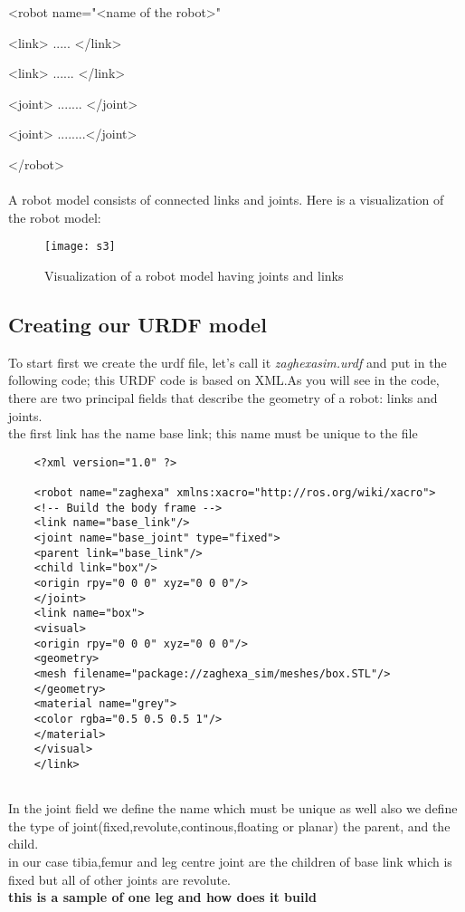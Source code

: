 	<robot name="<name of the robot>"
	
	<link>  ..... </link>
	
	<link> ...... </link>
	
	<joint> ....... </joint>
	
	<joint> ........</joint>
	
	</robot>
	\\\\A robot model consists of connected links and joints. Here is a visualization of the robot model:
	\begin{figure}[h]
		\centering
		\texttt{[image: s3]}
		\caption{Visualization of a robot model having joints and links}
		\label{fig:s3}
	\end{figure}
	
	\subsection{Creating our URDF model}
	To start first we create the urdf file, let's call it\textit{ zaghexasim.urdf} and put in
	the following code; this URDF code is based on XML.As you will see in the code, there are two principal fields that describe the geometry of a robot: links and joints.\\
	the first link has the name base link; this name must be unique to the file\\
	\begin{lstlisting}
	<?xml version="1.0" ?>
	
	<robot name="zaghexa" xmlns:xacro="http://ros.org/wiki/xacro">
	<!-- Build the body frame -->
	<link name="base_link"/>
	<joint name="base_joint" type="fixed">
	<parent link="base_link"/>
	<child link="box"/>
	<origin rpy="0 0 0" xyz="0 0 0"/>
	</joint>
	<link name="box">
	<visual>
	<origin rpy="0 0 0" xyz="0 0 0"/>
	<geometry>
	<mesh filename="package://zaghexa_sim/meshes/box.STL"/>
	</geometry>
	<material name="grey">
	<color rgba="0.5 0.5 0.5 1"/>
	</material>
	</visual>
	</link>
	
	\end{lstlisting}
	In the joint field we define the name which must be unique as well also we define 
	the type of joint(fixed,revolute,continous,floating or planar) the parent, and the child.\\
	in our case tibia,femur and leg centre joint are the children of base link which is fixed but all of other joints are revolute.\\
	\textbf{this is a sample of one leg and how does it build}\\
